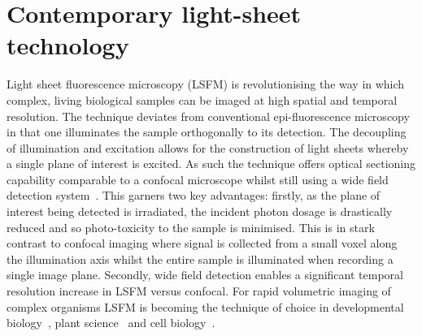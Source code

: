 \ifpdf
    \graphicspath{{Chapters/literature/Figs/Raster/}{Chapters/literature/Figs/PDF/}{Chapters/literature/Figs/}}
\else
    \graphicspath{{Chapters/literature/Figs/Vector/}{Chapters/Figs/}}
\fi


\chapter{Contemporary light-sheet technology}\label{chapter:literature}

Light sheet fluorescence microscopy (LSFM) is revolutionising the way in which complex, living biological samples can be imaged at high spatial and temporal resolution. %
The technique deviates from conventional epi-fluorescence microscopy in that one illuminates the sample orthogonally to its detection.
The decoupling of illumination and excitation allows for the construction of light sheets whereby a single plane of interest is excited.  %
As such the technique offers optical sectioning capability comparable to a confocal microscope whilst still using a wide field detection system~\cite{siedentpf_uber_1903,voie_orthogonal-plane_1993,huisken_optical_2004-1}. %
This garners two key advantages: firstly, as the plane of interest being detected is irradiated, the incident photon dosage is drastically reduced and so photo-toxicity to the sample is minimised.%
This is in stark contrast to confocal imaging where signal is collected from a small voxel along the illumination axis whilst the entire sample is illuminated when recording a single image plane.
Secondly, wide field detection enables a significant temporal resolution increase in LSFM versus confocal.
For rapid volumetric imaging of complex organisms LSFM is becoming the technique of choice in developmental biology~\cite{keller_fast_2010,verveer_high-resolution_2007,mickoleit_high-resolution_2014,icha_using_2016,keller_visualizing_2015,ichikawa_live_2014}, plant science~\cite{wangenheim_rules_2016} and cell biology~\cite{capoulade_quantitative_2011,cella_zanacchi_live-cell_2011}.

